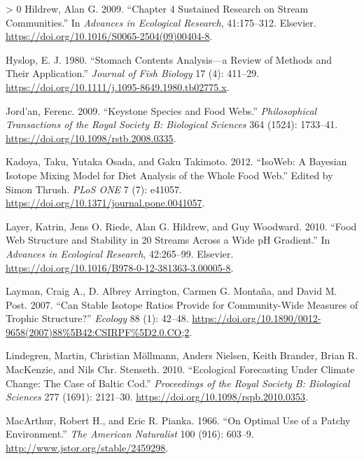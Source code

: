 \documentclass{article}
\newlength{\cslhangindent}
\newenvironment{CSLReferences}[3] %
 {%
  \setlength{\parindent}{0pt}
  \ifodd #1 \everypar{\setlength{\hangindent}{\cslhangindent}}\ignorespaces\fi
  \ifnum #2 > 0
  \setlength{\parskip}{#2\baselineskip}
  \fi
 }%
 {}
\begin{document}
\begin{CSLReferences}{1}{0}
\leavevmode\hypertarget{ref-hildrewChapterSustainedResearch2009}{}%
Hildrew, Alan G. 2009. {``Chapter 4 {Sustained Research} on {Stream
Communities}.''} In \emph{Advances in {Ecological Research}},
41:175--312. {Elsevier}.
\url{https://doi.org/10.1016/S0065-2504(09)00404-8}.

\leavevmode\hypertarget{ref-hyslopStomachContentsAnalysis1980}{}%
Hyslop, E. J. 1980. {``Stomach Contents Analysis---a Review of Methods
and Their Application.''} \emph{Journal of Fish Biology} 17 (4):
411--29. \url{https://doi.org/10.1111/j.1095-8649.1980.tb02775.x}.

\leavevmode\hypertarget{ref-jordanKeystoneSpeciesFood2009}{}%
Jord'an, Ferenc. 2009. {``Keystone Species and Food Webs.''}
\emph{Philosophical Transactions of the Royal Society B: Biological
Sciences} 364 (1524): 1733--41.
\url{https://doi.org/10.1098/rstb.2008.0335}.

\leavevmode\hypertarget{ref-kadoyaIsoWebBayesianIsotope2012}{}%
Kadoya, Taku, Yutaka Osada, and Gaku Takimoto. 2012. {``{IsoWeb}: {A
Bayesian Isotope Mixing Model} for {Diet Analysis} of the {Whole Food
Web}.''} Edited by Simon Thrush. \emph{PLoS ONE} 7 (7): e41057.
\url{https://doi.org/10.1371/journal.pone.0041057}.

\leavevmode\hypertarget{ref-layerFoodWebStructure2010}{}%
Layer, Katrin, Jens O. Riede, Alan G. Hildrew, and Guy Woodward. 2010.
{``Food {Web Structure} and {Stability} in 20 {Streams Across} a {Wide
pH Gradient}.''} In \emph{Advances in {Ecological Research}},
42:265--99. {Elsevier}.
\url{https://doi.org/10.1016/B978-0-12-381363-3.00005-8}.

\leavevmode\hypertarget{ref-laymanCanStableIsotope2007}{}%
Layman, Craig A., D. Albrey Arrington, Carmen G. Montaña, and David M.
Post. 2007. {``Can {Stable Isotope Ratios Provide} for {Community}-{Wide
Measures} of {Trophic Structure}?''} \emph{Ecology} 88 (1): 42--48.
\url{https://doi.org/10.1890/0012-9658(2007)88\%5B42:CSIRPF\%5D2.0.CO;2}.

\leavevmode\hypertarget{ref-lindegrenEcologicalForecastingClimate2010}{}%
Lindegren, Martin, Christian Möllmann, Anders Nielsen, Keith Brander,
Brian R. MacKenzie, and Nils Chr. Stenseth. 2010. {``Ecological
Forecasting Under Climate Change: The Case of {Baltic} Cod.''}
\emph{Proceedings of the Royal Society B: Biological Sciences} 277
(1691): 2121--30. \url{https://doi.org/10.1098/rspb.2010.0353}.

\leavevmode\hypertarget{ref-macarthurOptimalUsePatchy1966}{}%
MacArthur, Robert H., and Eric R. Pianka. 1966. {``On {Optimal Use} of a
{Patchy Environment}.''} \emph{The American Naturalist} 100 (916):
603--9. \url{http://www.jstor.org/stable/2459298}.


\end{CSLReferences}
\end{document}

